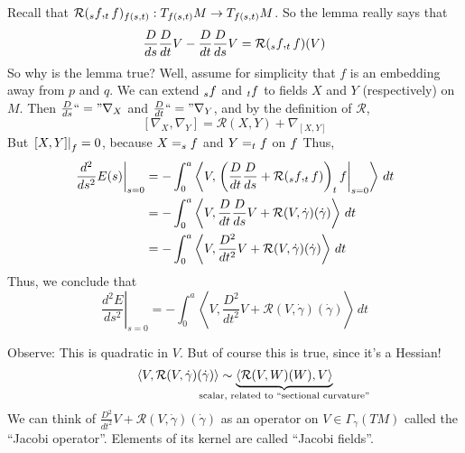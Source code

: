 \documentclass[10pt,letterpaper]{article}
\newcommand{\ptxt}[1]{\textrm{\textnormal{#1}}}
\let\d\relax
\newcommand{\d}{\partial}
\newcommand{\comm}[1]{\left[#1\right]}
\newcommand{\restr}[1]{\left.#1\right|}
\newcommand{\iprod}[1]{\left<#1\right>}
\let\Im\relax
\DeclareMathOperator{\Im}{Im}
\newcommand{\paren}[1]{\left(#1\right)}
\newcommand{\mc}[1]{\mathcal{#1}}
\begin{document}
\par\noindent
Recall that $\mathcal{R}(\d_{s}f,\d_{t}f)_{f(s,t)}:T_{f(s,t)}M\to{}T_{f(s,t)}M$. So the lemma really says that
\[
	\frac{D}{ds}\frac{D}{dt}V-\frac{D}{dt}\frac{D}{ds}V=\mathcal{R}(\d_{s}f,\d_{t}f)(V)
\]
So why is the lemma true? Well, assume for simplicity that $f$ is an embedding away from $p$ and $q$. We can extend $\d_{s}f$ and $\d_{t}f$ to fields $X$ and $Y$ (respectively) on $M$. Then $\frac{D}{ds}\ptxt{``}=\ptxt{''}\nabla_{X}$ and $\frac{D}{dt}\ptxt{``}=\ptxt{''}\nabla_{Y}$, and by the definition of $\mathcal{R}$,
\[
	\comm{\nabla_{X},\nabla_{Y}}=\mathcal{R}(X,Y)+\nabla_{\comm{X,Y}}
\]
But $\restr{\comm{X,Y}}_{\Im{}f}=0$, because $X=\d_{s}f$ and $Y=\d_{t}f$ on $\Im{}f$ Thus,
\begin{align*}
	\restr{\frac{d^{2}}{ds^{2}}E(s)}_{s=0} & =-\int_{0}^{a}\iprod{V,\restr{\paren{\frac{D}{dt}\frac{D}{ds}+\mathcal{R}(\d_{s}f,\d_{t}f)}\d_{t}f}_{s=0}}\,dt\\
	& =-\int_{0}^{a}\iprod{V,\frac{D}{dt}\frac{D}{ds}V+\mc{R}(V,\dot\gamma)(\dot\gamma)}\,dt\\
	& =-\int_{0}^{a}\iprod{V,\frac{D^{2}}{dt^{2}}V+\mc{R}(V,\dot\gamma)(\dot\gamma)}\,dt
\end{align*}
Thus, we conclude that
\[
	\restr{\frac{d^{2}E}{ds^{2}}}_{s=0}=-\int_{0}^{a}\iprod{V,\frac{D^{2}}{dt^{2}}V+\mc{R}(V,\dot\gamma)(\dot\gamma)}\,dt
\]

\par\noindent
Observe: This is quadratic in $V$. But of course this is true, since it's a Hessian!
\[
	\iprod{V,\mc{R}(V,\dot\gamma)(\dot\gamma)}\sim\underbrace{\iprod{\mc{R}(V,W)(W),V}}_{\mathclap{\ptxt{scalar, related to ``sectional curvature''}}}
\]
We can think of $\frac{D^{2}}{dt^{2}}V+\mc{R}(V,\dot\gamma)(\dot\gamma)$ as an operator on $V\in\Gamma_{\gamma}(TM)$ called the ``Jacobi operator''. Elements of its kernel are called ``Jacobi fields''.
\end{document}
